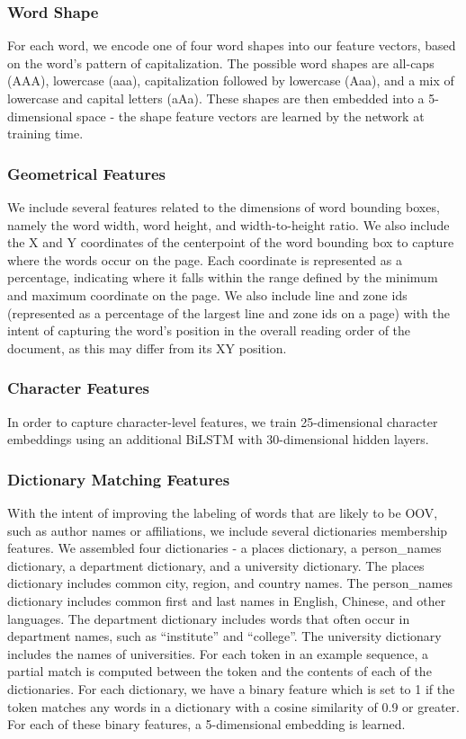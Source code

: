 \documentclass{acm_proc_article-sp}
\begin{document}
\subsubsection{Word Shape}
For each word, we encode one of four word shapes into our feature vectors, based on the word’s pattern of capitalization. The possible word shapes are all-caps (AAA), lowercase (aaa), capitalization followed by lowercase (Aaa), and a mix of lowercase and capital letters (aAa). These shapes are then embedded into a 5-dimensional space - the shape feature vectors are learned by the network at training time.

\subsubsection{Geometrical Features}
We include several features related to the dimensions of word bounding boxes, namely the word width, word height, and width-to-height ratio. We also include the X and Y coordinates of the centerpoint of the word bounding box to capture where the words occur on the page. Each coordinate is represented as a percentage, indicating where it falls within the range defined by the minimum and maximum coordinate on the page. We also include line and zone ids (represented as a percentage of the largest line and zone ids on a page) with the intent of capturing the word’s position in the overall reading order of the document, as this may differ from its XY position.

\subsubsection{Character Features}
In order to capture character-level features, we train 25-dimensional character embeddings using an additional BiLSTM with 30-dimensional hidden layers. 

\subsubsection{Dictionary Matching Features}
With the intent of improving the labeling of words that are likely to be OOV, such as author names or affiliations, we include several dictionaries membership features. We assembled four dictionaries - a places dictionary, a person\_names dictionary, a department dictionary, and a university dictionary. The places dictionary includes common city, region, and country names. The person\_names dictionary includes common first and last names in English, Chinese, and other languages. The department dictionary includes words that often occur in department names, such as “institute” and “college”. The university dictionary includes the names of universities. For each token in an example sequence, a partial match is computed between the token and the contents of each of the dictionaries. For each dictionary, we have a binary feature which is set to 1 if the token matches any words in a dictionary with a cosine similarity of 0.9 or greater. For each of these binary features, a 5-dimensional embedding is learned.
\end{document}
